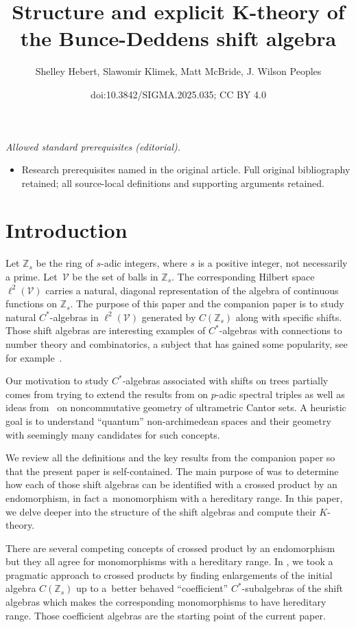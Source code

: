 \documentclass[10pt,a4paper]{amsart}
\title{Structure and explicit K-theory of the Bunce-Deddens shift algebra}
\author{Shelley Hebert, Slawomir Klimek, Matt McBride, J. Wilson Peoples}
\date{doi:10.3842/SIGMA.2025.035; CC BY 4.0}
\newcommand{\Z}{{\mathbb Z}}
\numberwithin{equation}{section}
\begin{document}
\maketitle
\noindent\textit{Allowed standard prerequisites (editorial).}\begin{itemize}
\item Research prerequisites named in the original article. Full original bibliography retained; all source-local definitions and supporting arguments retained.
\end{itemize}\medskip
\section{Introduction}
Let $\Z_s$ be the ring of $s$-adic integers, where $s$ is a positive integer, not necessarily a prime. Let~$\mathcal{V}$ be the set of balls in $\Z_s$. The corresponding Hilbert space $\ell^2(\mathcal{V})$ carries a natural, diagonal representation of the algebra of continuous functions on $\Z_s$. The purpose of this paper and the companion paper \cite{HKMP3} is to study natural $C^*$-algebras in $\ell^2(\mathcal{V})$ generated by $C(\Z_s)$ along with specific shifts. Those shift algebras are interesting examples of $C^*$-algebras with connections to number theory and combinatorics, a subject that has gained some popularity, see for example~\cite{CL,R}.

Our motivation to study $C^*$-algebras associated with shifts on trees partially comes from trying to extend the results from \cite{KMR, KRS1, KRS2} on $p$-adic spectral triples as well as ideas from~\cite{PB} on noncommutative geometry of ultrametric Cantor sets. A heuristic goal is to understand ``quantum'' non-archimedean spaces and their geometry with seemingly many candidates for such concepts.

We review all the definitions and the key results from the companion paper \cite{HKMP3} so that the present paper is self-contained. The main purpose of \cite{HKMP3} was to determine how each of those shift algebras can be identified with a crossed product by an endomorphism, in fact a~monomorphism with a hereditary range. In this paper, we delve deeper into the structure of the shift algebras and compute their $K$-theory.

There are several competing concepts of crossed product by an endomorphism \cite{ABL,BKR,E,Mu,St} but they all agree for monomorphisms with a hereditary range. In \cite{HKMP3}, we took a pragmatic approach to crossed products by finding enlargements of the initial algebra $C(\Z_s)$ up to a~better behaved ``coefficient'' $C^*$-subalgebras of the shift algebras which makes the corresponding monomorphisms to have hereditary range. Those coefficient algebras are the starting point of the current paper.
\end{document}
